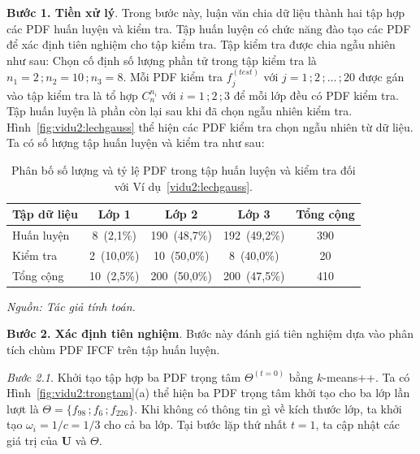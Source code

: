 \documentclass[a4paper,oneside]{book} %
\theoremstyle{plain}
\theoremstyle{plain}
\theoremstyle{nonumberplain}
\begin{document}
\textbf{Bước 1. Tiền xử lý}. Trong bước này, luận văn chia dữ liệu thành hai tập hợp các PDF huấn luyện và kiểm tra. Tập huấn luyện có chức năng đào tạo các PDF để xác định tiên nghiệm cho tập kiểm tra. Tập kiểm tra được chia ngẫu nhiên như sau:
Chọn cố định số lượng phần tử trong tập kiểm tra là $n_1 = 2\,; n_2= 10\,; n_3 = 8$. Mỗi PDF kiểm tra $f^{(test)}_j$ với $j = 1\,;2\,;\ldots\,;20$ được gán vào tập kiểm tra là tổ hợp $C_{n}^{n_i}$ với $i=1\,;2\,; 3$ để mỗi lớp đều có PDF kiểm tra. Tập huấn luyện là phần còn lại sau khi đã chọn ngẫu nhiên kiểm tra.  Hình~\ref{fig:vidu2:lechgauss} thể hiện các PDF kiểm tra chọn ngẫu nhiên từ dữ liệu. Ta có số lượng tập huấn luyện và kiểm tra như sau:

\begin{table}[H]
	\centering
	\fontsize{11pt}{14pt}\selectfont
	\caption{Phân bố số lượng và tỷ lệ PDF trong tập huấn luyện và kiểm tra đối với Ví dụ~\ref{vidu2:lechgauss}.}
	\begin{tabular*}{\columnwidth}{@{\extracolsep\fill}lcccc@{\extracolsep\fill}} 
		\toprule
		\textbf{Tập dữ liệu} & \textbf{Lớp 1} & \textbf{Lớp 2} & \textbf{Lớp 3} & \textbf{Tổng cộng} \\
		\midrule
		Huấn luyện 
		& 8~(2{,}1\%) 
		& 190~(48{,}7\%) 
		& 192~(49{,}2\%) 
		& 390 \\
		Kiểm tra   
		& 2~(10{,}0\%) 
		& 10~(50{,}0\%) 
		& 8~(40{,}0\%) 
		& 20 \\
		{Tổng cộng} 
		& {10~(2{,}5\%)} 
		& {200~(50{,}0\%)} 
		& {200~(47{,}5\%)} 
		& {410} \\
		\bottomrule
	\end{tabular*}
	\label{tab:phanbo_du_lieu}
	\begin{minipage}{\textwidth}
		\fontsize{11pt}{14pt}\selectfont\it
		Nguồn: Tác giả tính toán.
	\end{minipage}
\end{table}


\textbf{Bước 2. Xác định tiên nghiệm}. Bước này đánh giá tiên nghiệm dựa vào phân tích chùm PDF IFCF trên tập huấn luyện.

\textit{Bước 2.1.} Khởi tạo tập hợp ba PDF trọng tâm $\Theta^{(t=0)}$ bằng $k$-means++. Ta có Hình~\ref{fig:vidu2:trongtam}(a) thể hiện ba PDF trọng tâm khởi tạo cho ba lớp lần lượt là $\Theta =\{f_{98}\,; f_{6}\,;f_{226}\}$. Khi không có thông tin gì về kích thước lớp, ta khởi tạo $\omega_i=1/c=1/3$ cho cả ba lớp. Tại bước lặp thứ nhất $t=1$, ta cập nhật các giá trị của $\bm U$ và $\Theta$.
\end{document}
